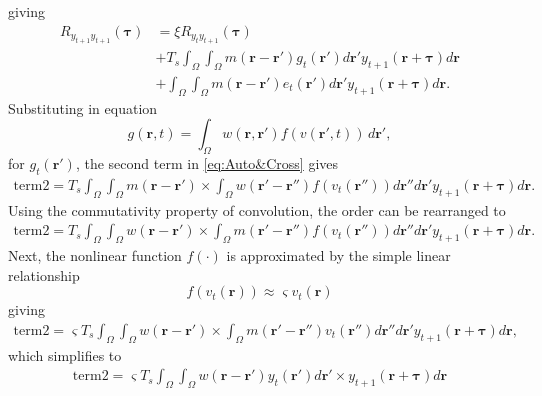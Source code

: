\documentclass[]{article}
\begin{document}
giving
\begin{align}\label{eq:Auto&Cross}
	R_{y_{t+1}y_{t+1}}(\boldsymbol{\tau}) &= \xi R_{y_ty_{t+1}}(\boldsymbol{\tau}) \nonumber \\
	&+ T_s \int_{\Omega}\int_{\Omega} m(\mathbf{r}-\mathbf{r}')  g_t(\mathbf{r}') d\mathbf{r}' y_{t+1}(\mathbf{r}+\boldsymbol{\tau}) d\mathbf{r} \nonumber \\
	&+\int_{\Omega}\int_{\Omega} m(\mathbf{r}-\mathbf{r}')e_t(\mathbf{r}')d\mathbf{r}'y_{t+1}(\mathbf{r}+\boldsymbol{\tau}) d\mathbf{r}.
\end{align}
Substituting in equation
\begin{equation}
	\label{eq:RateBasedInteractions} g\left( \mathbf{r},t \right) = \int_\Omega {w\left( \mathbf{r},\mathbf{r}' \right)f\left( v\left( \mathbf{r}',t \right) \right)\, d\mathbf{r}'}, 
\end{equation}
for $g_t(\mathbf{r}')$, the second term in \eqref{eq:Auto&Cross} gives
\begin{align}
	\text{term2} = T_s \int_{\Omega}\int_{\Omega} m(\mathbf{r}-\mathbf{r}') 
	\times \int_{\Omega} w(\mathbf{r}'-\mathbf{r}'') f\left(v_t(\mathbf{r}'')\right)d\mathbf{r}'' d\mathbf{r}' y_{t+1}(\mathbf{r}+\boldsymbol{\tau}) d\mathbf{r}. 
\end{align} 
Using the commutativity property of convolution, the order can be rearranged to
\begin{align}
	\text{term2}  =  T_s \int_{\Omega}\int_{\Omega} w(\mathbf{r}-\mathbf{r}')
	\times \int_{\Omega} m(\mathbf{r}'-\mathbf{r}'') f\left(v_t(\mathbf{r}'')\right) d\mathbf{r}'' d\mathbf{r}' y_{t+1}(\mathbf{r}+\boldsymbol{\tau}) d\mathbf{r}.
\end{align}
Next, the nonlinear function $f(\cdot)$ is approximated by the simple linear relationship
\begin{equation}
	f\left(v_t(\mathbf{r})\right) \approx \varsigma v_t(\mathbf{r})
\end{equation} 
giving
\begin{align}
	\text{term2} =  \varsigma T_s \int_{\Omega}\int_{\Omega} w(\mathbf{r}-\mathbf{r}') 
	\times \int_{\Omega} m(\mathbf{r}'-\mathbf{r}'')  v_t(\mathbf{r}'') d\mathbf{r}'' d\mathbf{r}' y_{t+1}(\mathbf{r}+\boldsymbol{\tau}) d\mathbf{r},
\end{align}
which simplifies to
\begin{align}
	\text{term2}=  \varsigma T_s \int_{\Omega}\int_{\Omega} w(\mathbf{r}-\mathbf{r}')y_t(\mathbf{r}') d\mathbf{r}' 
	\times y_{t+1}(\mathbf{r}+\boldsymbol{\tau}) d\mathbf{r}
\end{align}
\end{document}
